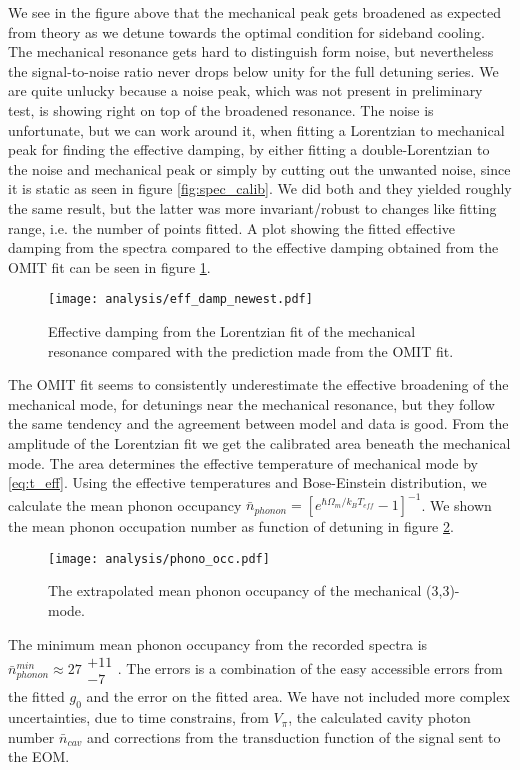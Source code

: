 We see in the figure above that the mechanical peak gets broadened as expected from theory as we detune towards the optimal condition for sideband cooling. The mechanical resonance gets hard to distinguish form noise, but nevertheless the signal-to-noise ratio never drops below unity for the full detuning series. We are quite unlucky because a noise peak, which was not present in preliminary test, is showing right on top of the broadened resonance. The noise is unfortunate, but we can work around it, when fitting a Lorentzian to mechanical peak for finding the effective damping, by either fitting a double-Lorentzian to the noise and mechanical peak or simply by cutting out the unwanted noise, since it is static as seen in figure \ref{fig:spec_calib}. We did both and they yielded roughly the same result, but the latter was more invariant/robust to changes like fitting range, i.e. the number of points fitted. A plot showing the fitted effective damping from the spectra compared to the effective damping obtained from the OMIT fit can be seen in figure \ref{fig:spec_eff_damp}.

\begin{figure}[H]
\centering
\texttt{[image: analysis/eff\_damp\_newest.pdf]}
\caption{Effective damping from the Lorentzian fit of the mechanical resonance compared with the prediction made from the OMIT fit.}
\label{fig:spec_eff_damp}
\end{figure}

The OMIT fit seems to consistently underestimate the effective broadening of the mechanical mode, for detunings near the mechanical resonance, but they follow the same tendency and the agreement between model and data is good. From the amplitude of the Lorentzian fit we get the calibrated area beneath the mechanical mode. The area determines the effective temperature of mechanical mode by \eqref{eq:t_eff}. Using the effective temperatures and Bose-Einstein distribution, we calculate the mean phonon occupancy $\bar{n}_{phonon} = \left[e^{\hbar\Omega_m/k_BT_{eff}} - 1\right]^{-1}$. We shown the mean phonon occupation number as function of detuning in figure \ref{fig:phonon_occ}.

\begin{figure}[H]
\centering
\texttt{[image: analysis/phono\_occ.pdf]}
\caption{The extrapolated mean phonon occupancy of the mechanical (3,3)-mode.}
\label{fig:phonon_occ}
\end{figure}

The minimum mean phonon occupancy from the recorded spectra is $\bar{n}_{phonon}^{min} \approx 27\substack{+11 \\ -7}$. The errors is a combination of the easy accessible errors from the fitted $g_0$ and the error on the fitted area. We have not included more complex uncertainties, due to time constrains, from $V_{\pi}$, the calculated cavity photon number $\bar{n}_{cav}$ and corrections from the transduction function of the signal sent to the EOM.